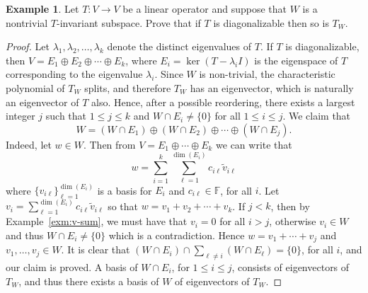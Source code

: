 \documentclass[12pt]{article}
\newcommand{\tv}{T:V\rightarrow V}
\theoremstyle{definition}
\newtheorem{example}{Example}[section]
\begin{document}
\begin{example}
Let $\tv$ be a linear operator and suppose that $W$ is a nontrivial $T$-invariant subspace.  Prove that if $T$ is diagonalizable then so is $T_W$.
\end{example}
\begin{proof}
Let $\lambda_1,\lambda_2,\ldots,\lambda_k$ denote the distinct eigenvalues of $T$.  If $T$ is diagonalizable, then $V=E_1\oplus E_2 \oplus \cdots \oplus E_k$, where $E_i=\ker(T-\lambda_i I)$ is the eigenspace of $T$ corresponding to the eigenvalue $\lambda_i$.  Since $W$ is non-trivial, the characteristic polynomial of $T_W$ splits, and therefore $T_W$ has an eigenvector, which is naturally an eigenvector of $T$ also.  Hence, after a possible reordering, there exists a largest integer $j$ such that $1\leq j\leq k$ and $W\cap E_i\neq\{0\}$ for all $1\leq i\leq j$.  We claim that
\[
W = (W\cap E_1) \oplus (W\cap E_2) \oplus \cdots \oplus (W\cap E_j).
\]
Indeed, let $w\in W$.  Then from $V=E_1\oplus \cdots\oplus E_k$ we can write that 
\[
w=\sum_{i=1}^k \sum_{\ell=1}^{\dim(E_i)} c_{i\ell}\tilde{v}_{i\ell}
\]
where $\{v_{i\ell}\}_{\ell=1}^{\dim(E_i)}$ is a basis for $E_i$ and $c_{i\ell}\in\mathbb{F}$, for all $i$.  Let $v_i = \sum_{\ell=1}^{\dim(E_i)} c_{i\ell}\tilde{v}_{i\ell}$ so that $w=v_1+v_2+\cdots+v_k$.  If $j< k$, then by Example~\ref{exm:v-sum}, we must have that $v_i = 0$ for all $i>j$, otherwise $v_i \in W$ and thus $W\cap E_i \neq \{0\}$ which is a contradiction.  Hence $w=v_1+\cdots+v_j$ and $v_1,\ldots,v_j \in W$.  It is clear that $(W\cap E_i) \cap \sum_{\ell\neq i} (W\cap E_\ell) = \{0\}$, for all $i$, and our claim is proved.  A basis of $W\cap E_i$, for $1\leq i\leq j$, consists of eigenvectors of $T_W$, and thus there exists a basis of $W$ of eigenvectors of $T_W$.
\end{proof}
\end{document}
